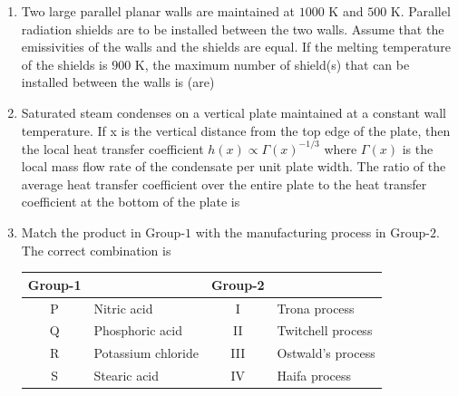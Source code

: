 \documentclass[journal]{IEEEtran}
\numberwithin{equation}{enumi}
\numberwithin{figure}{enumi}
\begin{document}
\begin{enumerate}[start=1, label={Q\arabic*.}]
\begin{enumerate}
  \end{enumerate}
\newpage
\item Two large parallel planar walls are maintained at $1000$ K and $500$ K. Parallel radiation shields are to be installed between the two walls. Assume that the emissivities of the walls and the shields are equal. If the melting temperature of the shields is $900$ K, the maximum number of shield(s) that can be installed between the walls is (are)
\begin{enumerate} 
  \end{enumerate}
  \item Saturated steam condenses on a vertical plate maintained at a constant wall temperature. If x is the vertical distance from the top edge of the plate, then the local heat transfer coefficient $h(x) \propto \Gamma(x)^{-1/3}$ where $\Gamma(x)$ is the local mass flow rate of the condensate per unit plate width. The ratio of the average heat transfer coefficient over the entire plate to the heat transfer coefficient at the bottom of the plate is
\begin{enumerate} 
  \end{enumerate}
\item Match the product in Group-$1$ with the manufacturing process in Group-$2$. The correct combination is 
\begin{table}[h]
\centering
\begin{tabular}{|c|l|c|l|}
\hline
\textbf{Group-1} & & \textbf{Group-2} & \\ \hline
P & Nitric acid         & I   & Trona process \\ \hline
Q & Phosphoric acid     & II  & Twitchell process \\ \hline
R & Potassium chloride  & III & Ostwald's process \\ \hline
S & Stearic acid        & IV  & Haifa process \\ \hline

\end{tabular}
\end{table}
\end{enumerate}
\end{document}
